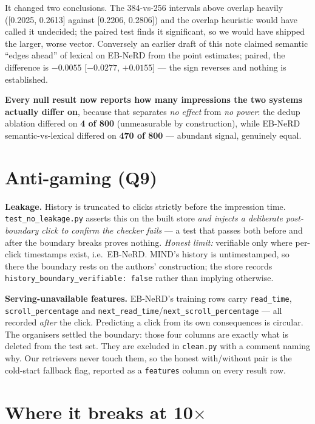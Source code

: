 \documentclass[10pt,a4paper]{article}
\begin{document}
It changed two conclusions. The 384-vs-256 intervals above overlap heavily ([0.2025, 0.2613] against
[0.2206, 0.2806]) and the overlap heuristic would have called it undecided; the paired test finds it
significant, so we would have shipped the larger, worse vector. Conversely an earlier draft of this
note claimed semantic ``edges ahead'' of lexical on EB-NeRD from the point estimates; paired, the
difference is $-0.0055$ [$-0.0277$, $+0.0155$] --- the sign reverses and nothing is established.

\textbf{Every null result now reports how many impressions the two systems actually differ on},
because that separates \emph{no effect} from \emph{no power}: the dedup ablation differed on
\textbf{4 of 800} (unmeasurable by construction), while EB-NeRD semantic-vs-lexical differed on
\textbf{470 of 800} --- abundant signal, genuinely equal.

\section{Anti-gaming (Q9)}

\textbf{Leakage.} History is truncated to clicks strictly before the impression time.
\texttt{test\_no\_leakage.py} asserts this on the built store \emph{and injects a deliberate
post-boundary click to confirm the checker fails} --- a test that passes both before and after the
boundary breaks proves nothing. \emph{Honest limit:} verifiable only where per-click timestamps
exist, i.e.\ EB-NeRD. MIND's history is untimestamped, so there the boundary rests on the authors'
construction; the store records \texttt{history\_boundary\_verifiable: false} rather than implying
otherwise.

\textbf{Serving-unavailable features.} EB-NeRD's training rows carry \texttt{read\_time},
\texttt{scroll\_percentage} and \texttt{next\_read\_time}/\texttt{next\_scroll\_percentage} --- all
recorded \emph{after} the click. Predicting a click from its own consequences is circular. The
organisers settled the boundary: those four columns are exactly what is deleted from the test set.
They are excluded in \texttt{clean.py} with a comment naming why. Our retrievers never touch them,
so the honest with/without pair is the cold-start fallback flag, reported as a \texttt{features}
column on every result row.

\section{Where it breaks at 10$\times$}
\end{document}
